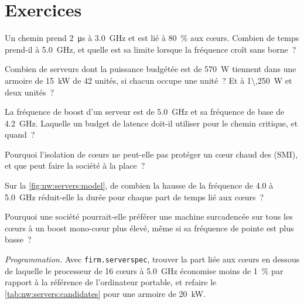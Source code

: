 \section{Exercices}

\begin{exercise}[$\star$]\label{exo:nw:servers:1}
Un chemin prend \qty{2}{\micro\second} à 3.0~GHz et est lié à 80~\% aux cœurs. Combien de temps prend-il à 5.0~GHz, et quelle est sa limite
lorsque la fréquence croît sans borne~?
\end{exercise}

\begin{exercise}[$\star$]\label{exo:nw:servers:2}
Combien de serveurs dont la puissance budgétée est de \qty{570}{\watt} tiennent dans une armoire de \qty{15}{\kilo\watt} de 42 unités, si chacun occupe une unité~? Et à
\qty{1\,250}{\watt} et deux unités~?
\end{exercise}

\begin{exercise}[$\star$]\label{exo:nw:servers:3}
La fréquence de boost d'un serveur est de 5.0~GHz et sa fréquence de base de 4.2~GHz. Laquelle un budget de latence doit-il utiliser pour le chemin critique, et quand~?
\end{exercise}

\begin{exercise}[$\star\star$]\label{exo:nw:servers:4}
Pourquoi l'isolation de cœurs ne peut-elle pas protéger un cœur chaud des  (SMI), et que peut faire la société à la place~?
\end{exercise}

\begin{exercise}[$\star\star$]\label{exo:nw:servers:5}
Sur la \cref{fig:nw:servers:model}, de combien la hausse de la fréquence de 4.0 à 5.0~GHz réduit-elle la durée pour chaque part de temps lié aux cœurs~?
\end{exercise}

\begin{exercise}[$\star\star$]\label{exo:nw:servers:6}
Pourquoi une société pourrait-elle préférer une machine surcadencée sur tous les cœurs à un boost mono-cœur plus élevé, même si sa fréquence de pointe est plus basse~?
\end{exercise}

\begin{exercise}[$\star\star\star$]\label{exo:nw:servers:7}
\emph{Programmation.} Avec \texttt{firm.serverspec}, trouver la part liée aux cœurs en dessous de laquelle le processeur de 16 cœurs à 5.0~GHz économise moins de 1~\% par rapport à la
référence de l'ordinateur portable, et refaire le \cref{tab:nw:servers:candidates} pour une armoire de \qty{20}{\kilo\watt}.
\end{exercise}

